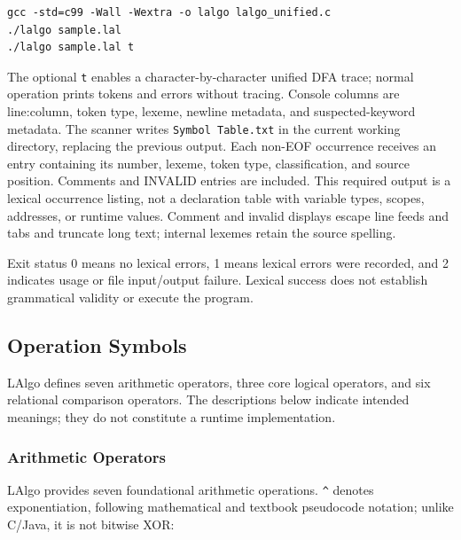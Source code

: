 \documentclass[11pt,a4paper]{article}
\newcommand{\codeinline}[1]{\texttt{#1}}
\begin{document}
\begin{lstlisting}[language={}]
gcc -std=c99 -Wall -Wextra -o lalgo lalgo_unified.c
./lalgo sample.lal
./lalgo sample.lal t
\end{lstlisting}

The optional \codeinline{t} enables a character-by-character unified DFA trace; normal operation prints tokens and errors without tracing. Console columns are line:column, token type, lexeme, newline metadata, and suspected-keyword metadata. The scanner writes \codeinline{Symbol Table.txt} in the current working directory, replacing the previous output. Each non-EOF occurrence receives an entry containing its number, lexeme, token type, classification, and source position. Comments and INVALID entries are included. This required output is a lexical occurrence listing, not a declaration table with variable types, scopes, addresses, or runtime values. Comment and invalid displays escape line feeds and tabs and truncate long text; internal lexemes retain the source spelling.

Exit status 0 means no lexical errors, 1 means lexical errors were recorded, and 2 indicates usage or file input/output failure. Lexical success does not establish grammatical validity or execute the program.

\subsection{Operation Symbols}

LAlgo defines seven arithmetic operators, three core logical operators, and six relational comparison operators. The descriptions below indicate intended meanings; they do not constitute a runtime implementation.

\subsubsection{Arithmetic Operators}

LAlgo provides seven foundational arithmetic operations. \codeinline{\textasciicircum} denotes exponentiation, following mathematical and textbook pseudocode notation; unlike C/Java, it is not bitwise XOR:
\end{document}
